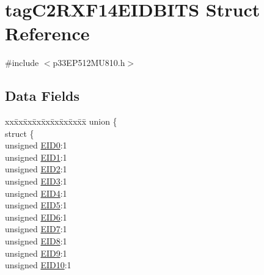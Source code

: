 \hypertarget{structtag_c2_r_x_f14_e_i_d_b_i_t_s}{}\section{tag\+C2\+R\+X\+F14\+E\+I\+D\+B\+I\+TS Struct Reference}
\label{structtag_c2_r_x_f14_e_i_d_b_i_t_s}


{\ttfamily \#include $<$p33\+E\+P512\+M\+U810.\+h$>$}

\subsection*{Data Fields}
\begin{DoxyCompactItemize}
\item 
\begin{tabbing}
xx\=xx\=xx\=xx\=xx\=xx\=xx\=xx\=xx\=\kill
union \{\\
\>struct \{\\
\>\>unsigned \hyperlink{structtag_c2_r_x_f14_e_i_d_b_i_t_s_a9da8b7b30247e4f9cd8cc056549aa9fd}{EID0}:1\\
\>\>unsigned \hyperlink{structtag_c2_r_x_f14_e_i_d_b_i_t_s_afd6c139491d147c1262f3d051c6691e9}{EID1}:1\\
\>\>unsigned \hyperlink{structtag_c2_r_x_f14_e_i_d_b_i_t_s_a36ec62d8d3c5acd5d15e6691dc099a94}{EID2}:1\\
\>\>unsigned \hyperlink{structtag_c2_r_x_f14_e_i_d_b_i_t_s_ab895f7d0ac289a0383b607cbc62eebe2}{EID3}:1\\
\>\>unsigned \hyperlink{structtag_c2_r_x_f14_e_i_d_b_i_t_s_a136d5a709d6618d40acceccb43036656}{EID4}:1\\
\>\>unsigned \hyperlink{structtag_c2_r_x_f14_e_i_d_b_i_t_s_a8dffb2d86a6c184df505ae7c71a58710}{EID5}:1\\
\>\>unsigned \hyperlink{structtag_c2_r_x_f14_e_i_d_b_i_t_s_af8a8574102515d8f1a4b7fd1685d0532}{EID6}:1\\
\>\>unsigned \hyperlink{structtag_c2_r_x_f14_e_i_d_b_i_t_s_a84c3262e67f8d5fd387ac10bde6fa9b1}{EID7}:1\\
\>\>unsigned \hyperlink{structtag_c2_r_x_f14_e_i_d_b_i_t_s_acca25e0b7d86eb499d01f85222baea87}{EID8}:1\\
\>\>unsigned \hyperlink{structtag_c2_r_x_f14_e_i_d_b_i_t_s_ac6748f73d4ada8538b06548be4f396c2}{EID9}:1\\
\>\>unsigned \hyperlink{structtag_c2_r_x_f14_e_i_d_b_i_t_s_a9cea8e77ecbb72bd3b08102412793725}{EID10}:1\\

\end{tabbing}
\end{DoxyCompactItemize}
